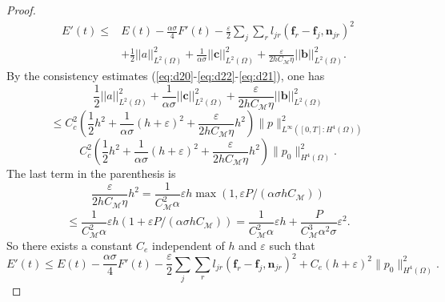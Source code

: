 \documentclass[a4paper,french,english,10pt]{article}
\newcommand\ljr{l_{jr}}
\newcommand\njr{\mathbf{n}_{jr}}
\newcommand\eps{\varepsilon}
\newcommand\fj{\mathbf{f}_j}
\newcommand\fr{\mathbf{f}_r}
\newcommand\cc{\mathbf{c}}
\newcommand\bb{\mathbf{b}}
\begin{document}
\begin{proof}
\begin{equation*} \label{eq:d40}
\begin{aligned}
E'(t) \leq & E(t)    - \frac{\alpha\sigma}{4}  F'(t)- \frac{\eps}{2}\sum_j\sum_r \ljr \left( \fr- \fj,  \njr\right )^2
\\
& 
+ \frac12  ||a||_{L^2(\Omega)}^2 
+  \frac{1}{ \alpha\sigma } ||\cc||^2_{L^2(\Omega)}
+  %
\frac{\eps}{2h C_\mathcal M \eta } ||\bb||^2_{L^2(\Omega)} .
\end{aligned}
\end{equation*}
By the consistency estimates (\ref{eq:d20}-\ref{eq:d22}-\ref{eq:d21}), one has 
$$
 \frac12  ||a||_{L^2(\Omega)}^2 
+  \frac{1}{ \alpha\sigma } ||\cc||^2_{L^2(\Omega)}
+  %
\frac{\eps}{2h C_\mathcal M \eta } ||\bb||^2_{L^2(\Omega)}
$$
$$
\leq C_c^2 \left( \frac12  h^2 +\frac1{\alpha \sigma}  (h+\varepsilon)^2
+\frac{\eps}{2h C_\mathcal M \eta }h^2
\right) \|    p  \|_{L^\infty([0,T]: H^4(\Omega))}^2
$$
$$
C_c^2 \left( \frac12  h^2 +\frac1{\alpha \sigma}  (h+\varepsilon)^2
+\frac{\eps}{2h C_\mathcal M \eta }h^2
\right) \|    p _0 \|_{ H^4(\Omega)}^2.
$$
The last term in the parenthesis
is 
$$
\frac{\eps}{2h C_\mathcal M \eta }h^2 = \frac1{C_\mathcal M^2\alpha}\varepsilon h 
\max\left( 1, \varepsilon P/(\alpha \sigma h   C_\mathcal M )   \right)
$$
$$
\leq
\frac1{C_\mathcal M^2\alpha}\varepsilon h 
\left( 1+ \varepsilon P/(\alpha \sigma h   C_\mathcal M )   \right)=
\frac1{C_\mathcal M^2\alpha}\varepsilon h 
+ \frac P{C_\mathcal M^3\alpha^2\sigma}\varepsilon ^2.
$$
So there exists a constant $C_e$ independent of $h$ and $\varepsilon$ such that
\begin{equation} \label{eq:efg1}
E'(t) \leq  E(t)    - \frac{\alpha\sigma}{4}  F'(t)- \frac{\eps}{2}\sum_j\sum_r \ljr \left( \fr- \fj,  \njr\right )^2 + C_e (h+\varepsilon)^2 \|    p_0  \|_{H^4(\Omega)}^2.
\end{equation}

\end{proof}
\end{document}
